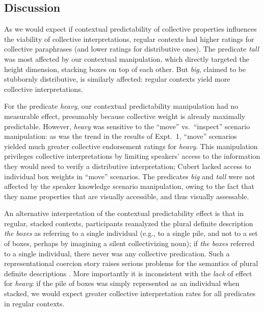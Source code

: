 \documentclass[preprint,12pt,authoryear,titlepage]{elsarticle}
\begin{document}
\subsection{Discussion}

As we would expect if contextual predictability of collective properties influences the viability of collective interpretations, regular contexts had higher ratings for collective paraphrases (and lower ratings for distributive ones). The predicate \textit{tall} was most affected by our contextual manipulation, which directly targeted the height dimension, stacking boxes on top of each other. But \emph{big}, claimed to be stubbornly distributive, is similarly affected: regular contexts yield more collective interpretations. 

For the predicate \emph{heavy}, our contextual predictability manipulation had no measurable effect, presumably because collective weight is already maximally predictable. However, \emph{heavy} was sensitive to the ``move'' vs.~``inspect'' scenario manipulation: as was the trend in the results of Expt.~1, ``move'' scenarios yielded much greater collective endorsement ratings for \emph{heavy}. This manipulation privileges collective interpretations by limiting speakers' access to the information they would need to verify a distributive interpretation; Cubert lacked access to individual box weights in ``move'' scenarios. The predicates \emph{big} and \emph{tall} were not affected by the speaker knowledge scenario manipulation, owing to the fact that they name properties that are visually accessible, and thus visually assessable.

An alternative interpretation of the contextual predictability effect is that in regular, stacked contexts, participants reanalyzed the plural definite description \emph{the boxes} as referring to a single individual (e.g., to a single pile, and not to a set of boxes, perhaps by imagining a silent collectivizing noun); if \emph{the boxes} referred to a single individual, there never was any collective predication.
Such a representational coercion story raises serious problems for the semantics of plural definite descriptions \citep[for discussion, see ][]{link1983,landman1989,schwarzschild1996,link1998}. More importantly it is inconsistent with the \emph{lack} of effect for \emph{heavy}: if the pile of boxes was simply represented as an individual when stacked, we would expect greater collective interpretation rates for all predicates in regular contexts.
\end{document}
